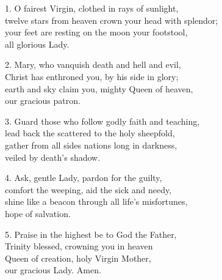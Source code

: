 1. O fairest Virgin, clothed in rays of sunlight,\\
twelve stars from heaven crown your head with splendor;\\
your feet are resting on the moon your footstool,\\
   all glorious Lady.

2. Mary, who vanquish death and hell and evil,\\
Christ has enthroned you, by his side in glory;\\
earth and sky claim you, mighty Queen of heaven,\\
   our gracious patron.

3. Guard those who follow godly faith and teaching,\\
lead back the scattered to the holy sheepfold,\\
gather from all sides nations long in darkness,\\
   veiled by death’s shadow.

4. Ask, gentle Lady, pardon for the guilty,\\
comfort the weeping, aid the sick and needy,\\
shine like a beacon through all life’s misfortunes,\\
   hope of salvation.

5. Praise in the highest be to God the Father,\\
Trinity blessed, crowning you in heaven\\
Queen of creation, holy Virgin Mother,\\
   our gracious Lady. Amen.